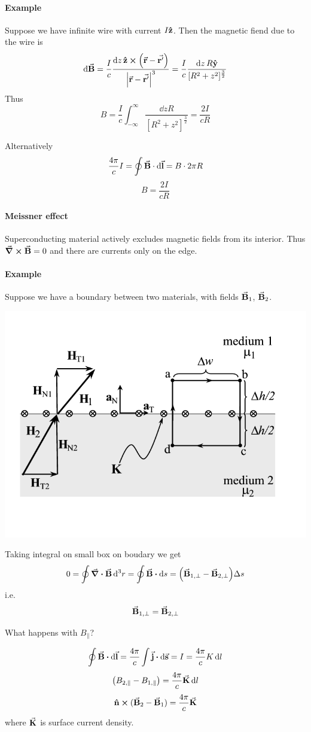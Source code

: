 \paragraph{Example}
Suppose we have infinite wire with current $I\vu{z}$. Then the magnetic fiend due to the wire is
$$\dd{\va{B}} = \frac{I}{c}\frac{\dd{z}\vu{z} \cross \qty(\va{r}-\va{r'})}{\abs{\va{r}-\va{r'}}^3} = \frac{I}{c} \frac{\dd{z} R \vu{y}}{[R^2+z^2]^{\frac{3}{2}}}$$
Thus
$$B = \frac{I}{c} \int_{-\infty}^{\infty} \frac{\dd{z}R}{[R^2+z^2]^{\frac{3}{2}}} = \frac{2I}{cR}$$

Alternatively
$$\frac{4\pi}{c}I = \oint \va{B}\cdot \dd{\va{l}} = B \cdot 2\pi R$$
$$B = \frac{2I}{cR}$$
\paragraph{Meissner effect} Superconducting material actively excludes magnetic fields from its interior. Thus $\curl{\va{B}} = 0$ and there are currents only on the edge.
\paragraph{Example}
Suppose we have a boundary between two materials, with fields $\va{B}_1$, $\va{B}_2$. 
\begin{center}
	\includegraphics[width=0.5\linewidth]{./lect7/pic1.png}
\end{center}
Taking integral on small box on boudary we get
$$0 = \oint \div{\va{B}} \dd[3]{r} = \oint \va{B} \vdot \dd{s} = \qty(\va{B}_{1,\perp}-\va{B}_{2,\perp}) \Delta s$$
i.e. 
$$\va{B}_{1,\perp}=\va{B}_{2,\perp}$$

What happens with $B_\parallel$?

$$\oint \va{B}\vdot \dd{\va{l}} = \frac{4\pi}{c} \int \va{j} \vdot \dd{\va{s}} = I  = \frac{4\pi}{c} K \dd{l}$$
$$\qty(B_{2, \parallel} - B_{1, \parallel}) = \frac{4\pi}{c} \va{K}  \dd{l}$$
$$\vu{n} \cross (\va{B}_2 - \va{B}_1) = \frac{4\pi}{c} \va{K} $$
where $\va{K}$ is surface current density.
